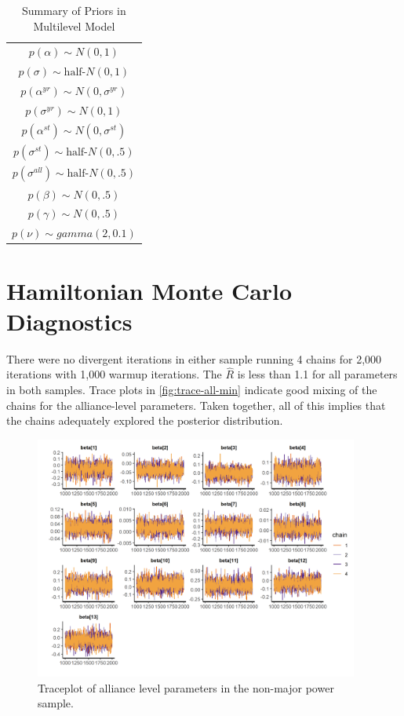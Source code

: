 \documentclass[12pt]{article}
\begin{document}
\begin{table} %
\begin{center}
\begin{tabular}{c} 
$ p(\alpha) \sim N(0, 1)$  \\
$ p(\sigma) \sim \mbox{half-}N(0, 1) $ \\
$ p(\alpha^{yr}) \sim N(0, \sigma^{yr}) $ \\ 
$ p(\sigma^{yr}) \sim N(0, 1) $ \\
$ p(\alpha^{st}) \sim N(0, \sigma^{st}) $ \\ 
$ p(\sigma^{st}) \sim \mbox{half-}N(0, .5) $ \\ 
$ p(\sigma^{all}) \sim \mbox{half-}N(0, .5) $ \\
$ p(\beta) \sim N(0, .5) $ \\
$ p(\gamma) \sim N(0, .5) $ \\ 
$ p(\nu) \sim gamma(2, 0.1)$ 
\end{tabular} 
\caption{Summary of Priors in Multilevel Model} 
\label{tab:priors}
\end{center} 
\end{table} 


\section{Hamiltonian Monte Carlo Diagnostics}

There were no divergent iterations in either sample running 4 chains for 2,000 iterations with 1,000 warmup iterations. 
The $\hat{R}$ is less than 1.1 for all parameters in both samples. 
Trace plots in \autoref{fig:trace-all-min} indicate good mixing of the chains for the alliance-level parameters. 
Taken together, all of this implies that the chains adequately explored the posterior distribution. 

\begin{figure}[htbp]
	\centering
		\includegraphics[width=0.95\textwidth]{trace-all-min.png}
	\caption{Traceplot of alliance level parameters in the non-major power sample.}
	\label{fig:trace-all-min}
\end{figure}
\end{document}
